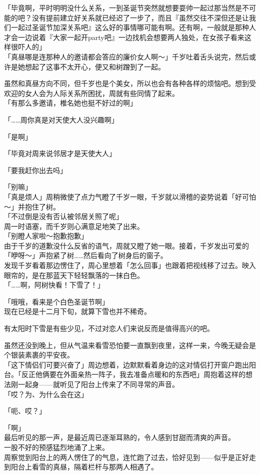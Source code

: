 「毕竟啊，平时明明没什么关系，一到圣诞节突然就想要耍帅一起过那当然是不可能的吧？没有提前建立好关系就已经迟了一步了，而且『虽然交往不深但还是让我们一起过圣诞节加深关系吧』这么好的事情哪可能有啊。还有啊，一般就是那种人才会一边说着『大家一起开party吧』一边找机会想要两人独处，在女孩子看来这样很吓人的」\\

「真昼哪是连那种人的邀请都会答应的廉价女人啊～」千岁吐着舌头说完，然后或许是她想起了这事不太开心，便又和树蹭到了一起。

虽然和真昼方向不同，但千岁也是个美女，所以也会有各种各样的烦恼吧。想到受欢迎的女人会为人际关系所困扰，周就有些同情了起来。\\

「有那么多邀请，椎名她也挺不好过的啊」

「……周你真是对天使大人没兴趣啊」

「是啊」

「毕竟对周来说邻居才是天使大人」

「要我赶你出去吗」

「别嘛」\\

「真是烦人」周稍微使了点力气瞪了千岁一眼，千岁就以滑稽的姿势说着「好可怕～」并抱住了树。\\

「不过倒是没有否认被邻居关照了呢」\\

周一时语塞，而千岁则心满意足地笑了出来。\\

「别瞪人家啦～抱歉抱歉」\\

由于千岁的道歉没什么反省的语气，周就又瞪了她一眼。接着，千岁发出可爱的「咿呀～」声抱紧了树……然后看向了树身后的窗子。\\

发现千岁看着那边愣住了，周心里想着「怎么回事」也跟着把视线移了过去。映入眼帘的，是在那蓝天下轻轻飘落的一抹白色。\\

「……啊，阿树快看！下雪了！」

「哦哦，看来是个白色圣诞节啊」\\

现在已经是十二月下旬，就算下雪也并不稀奇。

有太阳时下雪是有些少见，不过对恋人们来说反而是值得高兴的吧。

虽然还没到晚上，但从气温来看雪恐怕要一直飘到夜里，这样一来，今晚无疑会是个银装素裹的平安夜。\\

「这下情侣们可要兴奋了」周边想着，边默默看着身边的这对情侣打开窗户跑出阳台。「反正他俩要在外面亲热一阵子，我去准备点暖和的东西吧」周抱着这样的想法刚一起身——就听见了阳台上传来了不同寻常的声音。\\

「哎？为、为什么会在这」

「呃、哎？」

「啊」\\

最后听见的那一声，是最近周已逐渐耳熟的，令人感到甘甜而清爽的声音。\\

一股不好的预感猛烈地涌了上来。\\

周察觉到阳台上的两人愣住了的气息，连忙跑了过去，恰好见到——似乎是正好走到阳台上看雪的真昼，隔着栏杆与那两人相遇了。
